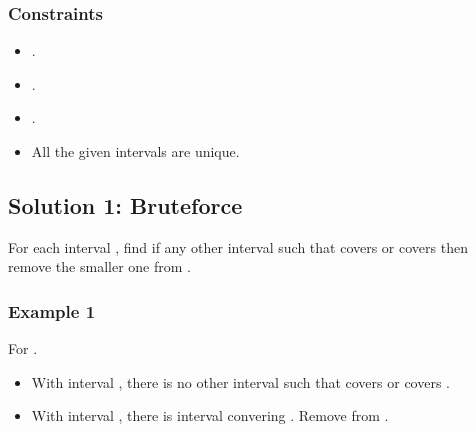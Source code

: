 \documentclass[letterpaper,12pt,english]{book}
\begin{document}
\subsubsection{Constraints}
\label{\detokenize{Sorting/04_SORT_1288_Remove_Covered_Intervals:constraints}}\begin{itemize}
\item {} 
\sphinxAtStartPar
{}.

\item {} 
\sphinxAtStartPar
{}.

\item {} 
\sphinxAtStartPar
{}.

\item {} 
\sphinxAtStartPar
All the given intervals are unique.

\end{itemize}


\subsection{Solution 1: Bruteforce}
\label{\detokenize{Sorting/04_SORT_1288_Remove_Covered_Intervals:solution-1-bruteforce}}
\sphinxAtStartPar
For each interval , find if any other interval  such that  covers  or  covers  then remove the smaller one from .


\subsubsection{Example 1}
\label{\detokenize{Sorting/04_SORT_1288_Remove_Covered_Intervals:id1}}
\sphinxAtStartPar
For .
\begin{itemize}
\item {} 
\sphinxAtStartPar
With interval , there is no other interval  such that covers  or  covers .

\item {} 
\sphinxAtStartPar
With interval , there is interval  convering . Remove \sphinxcode{\sphinxupquote{{[}3,6{]}}} from .

\end{itemize}
\end{document}
